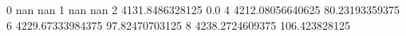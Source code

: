0 nan nan
1 nan nan
2 4131.8486328125 0.0
4 4212.08056640625 80.23193359375
6 4229.67333984375 97.82470703125
8 4238.2724609375 106.423828125

